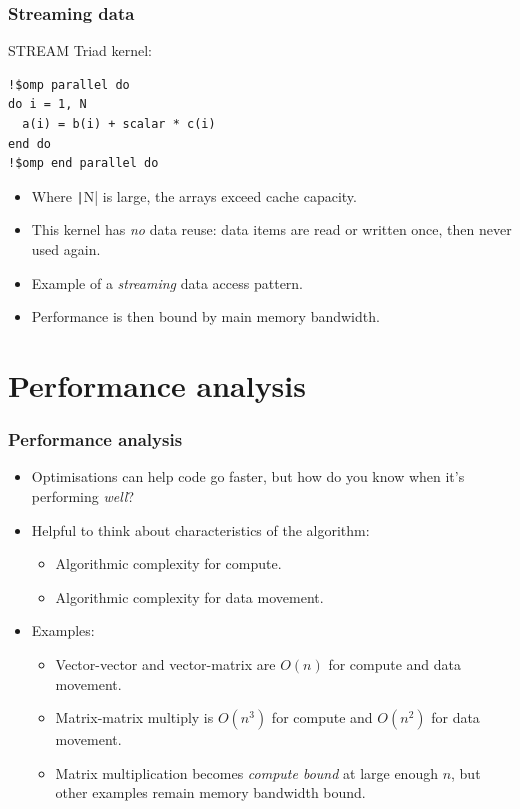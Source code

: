 \documentclass{beamer}
\begin{document}
\begin{frame}[fragile]
\frametitle{Streaming data}

STREAM Triad kernel:

\begin{verbatim}
!$omp parallel do
do i = 1, N
  a(i) = b(i) + scalar * c(i)
end do
!$omp end parallel do
\end{verbatim}

\begin{itemize}
  \item Where \texttt|N| is large, the arrays exceed cache capacity.
  \item This kernel has \emph{no} data reuse: data items are read or written once, then never used again.
  \item Example of a \emph{streaming} data access pattern.
  \item Performance is then bound by main memory bandwidth.
\end{itemize}

\end{frame}

\section{Performance analysis}
\begin{frame}
\frametitle{Performance analysis}
\begin{itemize}
  \item Optimisations can help code go faster, but how do you know when it's performing \emph{well}?
  \item Helpful to think about characteristics of the algorithm:
    \begin{itemize}
      \item Algorithmic complexity for compute.
      \item Algorithmic complexity for data movement.
    \end{itemize}
  \item Examples:
    \begin{itemize}
      \item Vector-vector and vector-matrix are $O(n)$ for compute and data movement.
      \item Matrix-matrix multiply is $O(n^3)$ for compute and $O(n^2)$ for data movement.
      \item Matrix multiplication becomes \emph{compute bound} at large enough $n$, but other examples remain memory bandwidth bound.
    \end{itemize}
\end{itemize}
\end{frame}
\end{document}
